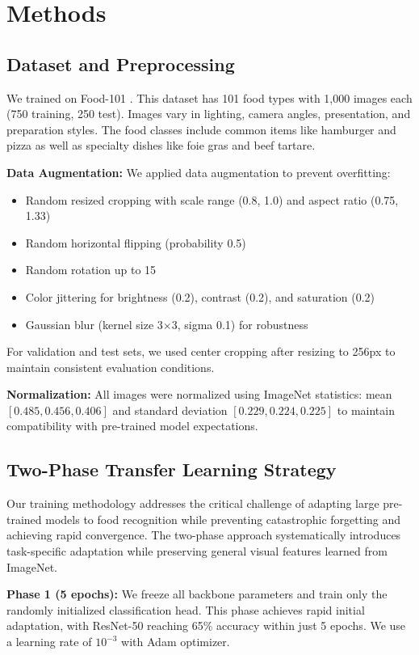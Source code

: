 \documentclass[conference]{IEEEtran}
\begin{document}
\section{Methods}
\subsection{Dataset and Preprocessing}
We trained on Food-101 \cite{bossard2014food101}. This dataset has 101 food types with 1,000 images each (750 training, 250 test). Images vary in lighting, camera angles, presentation, and preparation styles. The food classes include common items like hamburger and pizza as well as specialty dishes like foie gras and beef tartare.

\textbf{Data Augmentation:} We applied data augmentation to prevent overfitting:
\begin{itemize}
    \item Random resized cropping with scale range (0.8, 1.0) and aspect ratio (0.75, 1.33)
    \item Random horizontal flipping (probability 0.5)
    \item Random rotation up to 15\textdegree
    \item Color jittering for brightness (0.2), contrast (0.2), and saturation (0.2)
    \item Gaussian blur (kernel size 3$\times$3, sigma 0.1) for robustness
\end{itemize}
For validation and test sets, we used center cropping after resizing to 256px to maintain consistent evaluation conditions.

\textbf{Normalization:} All images were normalized using ImageNet statistics: mean $[0.485, 0.456, 0.406]$ and standard deviation $[0.229, 0.224, 0.225]$ to maintain compatibility with pre-trained model expectations.

\subsection{Two-Phase Transfer Learning Strategy}
Our training methodology addresses the critical challenge of adapting large pre-trained models to food recognition while preventing catastrophic forgetting and achieving rapid convergence. The two-phase approach systematically introduces task-specific adaptation while preserving general visual features learned from ImageNet.

\textbf{Phase 1 (5 epochs):} We freeze all backbone parameters and train only the randomly initialized classification head. This phase achieves rapid initial adaptation, with ResNet-50 reaching 65\% accuracy within just 5 epochs. We use a learning rate of $10^{-3}$ with Adam optimizer.
\end{document}
